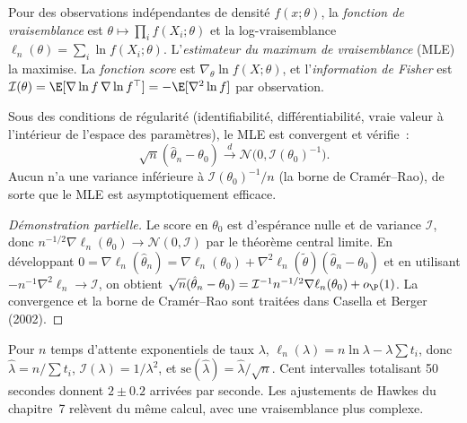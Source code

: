 \begin{definition}\label{def:qm:estimation:mle}
Pour des observations indépendantes de densité $f(x; \theta)$, la \emph{fonction de vraisemblance} est
$\theta \mapsto \prod_if(X_i; \theta)$ et la log-vraisemblance $\ell_n(\theta) = \sum_i\ln f(X_i; \theta)$. L'\emph{estimateur du maximum
de vraisemblance} (MLE) la maximise. La \emph{fonction score}
est $\nabla_\theta\ln f(X; \theta)$, et l'\emph{information de Fisher} est $\mathcal I(\theta) =
\E[\nabla\ln f\,\nabla\ln f^\top] = -\E[\nabla^2\ln f]$ par observation.
\end{definition}

\begin{theorem}\label{thm:qm:estimation:mle}
Sous des conditions de régularité (identifiabilité, différentiabilité, vraie valeur à l'intérieur de l'espace des paramètres), le MLE est convergent et vérifie~:
\[
\sqrt n(\hat\theta_n - \theta_0) \xrightarrow{d} \mathcal N\bigl(0, \mathcal I(\theta_0)^{-1}\bigr).
\]
Aucun  n'a une variance inférieure à $\mathcal I(\theta_0)^{-1}/n$ (la borne de Cramér--Rao), de sorte que le MLE est
asymptotiquement efficace.
\end{theorem}

\begin{proof}[Démonstration partielle]
Le score en $\theta_0$ est d'espérance nulle et de variance $\mathcal I$, donc $n^{-1/2}\nabla\ell_n(\theta_0) \to \mathcal N(0, \mathcal I)$ par le
théorème central limite. En développant $0 = \nabla\ell_n(\hat\theta_n) = \nabla\ell_n(\theta_0) + \nabla^2\ell_n(\tilde\theta)(\hat\theta_n - \theta_0)$ et en utilisant
$-n^{-1}\nabla^2\ell_n \to \mathcal I$, on obtient $\sqrt n(\hat\theta_n - \theta_0) = \mathcal I^{-1}n^{-1/2}\nabla\ell_n(\theta_0) + o_{\P}(1)$. La convergence
et la borne de Cramér--Rao sont traitées dans Casella et Berger (2002).
\end{proof}

\begin{example}\label{ex:qm:estimation:rate}
Pour $n$ temps d'attente exponentiels de taux $\lambda$, $\ell_n(\lambda) = n\ln\lambda - \lambda\sum t_i$, donc $\hat\lambda = n/\sum t_i$, $\mathcal I(\lambda) =
1/\lambda^2$, et $\mathrm{se}(\hat\lambda) = \hat\lambda/\sqrt n$. Cent intervalles totalisant 50 secondes donnent $2 \pm 0.2$ arrivées par seconde.
Les ajustements de Hawkes du chapitre~7 relèvent du même calcul, avec une vraisemblance plus complexe.
\end{example}

